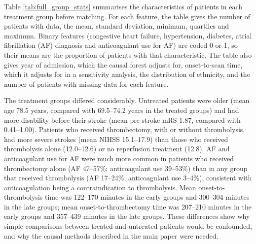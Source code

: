 Table \ref{tab:full_group_stats} summarises the characteristics of patients in each treatment group before matching. For each feature, the table gives the number of patients with data, the mean, standard deviation, minimum, quartiles and maximum. Binary features (congestive heart failure, hypertension, diabetes, atrial fibrillation (AF) diagnosis and anticoagulant use for AF) are coded 0 or 1, so their means are the proportion of patients with that characteristic. The table also gives year of admission, which the causal forest adjusts for, onset-to-scan time, which it adjusts for in a sensitivity analysis, the distribution of ethnicity, and the number of patients with missing data for each feature.

The treatment groups differed considerably. Untreated patients were older (mean age 78.5 years, compared with 69.5--74.2 years in the treated groups) and had more disability before their stroke (mean pre-stroke mRS 1.87, compared with 0.41--1.00). Patients who received thrombectomy, with or without thrombolysis, had more severe strokes (mean NIHSS 15.1--17.9) than those who received thrombolysis alone (12.0--12.6) or no reperfusion treatment (12.8). AF and anticoagulant use for AF were much more common in patients who received thrombectomy alone (AF 47--57\%; anticoagulant use 39--53\%) than in any group that received thrombolysis (AF 17--24\%; anticoagulant use 3--4\%), consistent with anticoagulation being a contraindication to thrombolysis. Mean onset-to-thrombolysis time was 122--170 minutes in the early groups and 300--304 minutes in the late groups; mean onset-to-thrombectomy time was 207--210 minutes in the early groups and 357--439 minutes in the late groups. These differences show why simple comparisons between treated and untreated patients would be confounded, and why the causal methods described in the main paper were needed.

